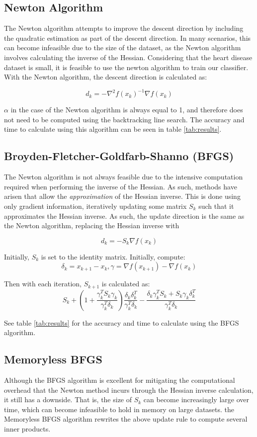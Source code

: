 \documentclass[12pt,conference]{IEEEtran}
\begin{document}
\subsection {Newton Algorithm}
The Newton algorithm attempts to improve the descent direction by including the quadratic estimation as part of the descent direction. In many scenarios, this can become infeasible due to the size of the dataset, as the Newton algorithm involves calculating the inverse of the Hessian. Considering that the heart disease dataset is small, it is feasible to use the newton algorithm to train our classifier. With the Newton algorithm, the descent direction is calculated as:

$$d_k = -\nabla^2f(x_k)^{-1}\nabla f(x_k)$$

$\alpha$ in the case of the Newton algorithm is always equal to 1, and therefore does not need to be computed using the backtracking line search. The accuracy and time to calculate using this algorithm can be seen in table \ref{tab:results}.

\subsection {Broyden-Fletcher-Goldfarb-Shanno (BFGS)}
The Newton algorithm is not always feasible due to the intensive computation required when performing the inverse of the Hessian. As such, methods have arisen that allow the \textit{approximation} of the Hessian inverse. This is done using only gradient information, iteratively updating some matrix $S_k$ such that it approximates the Hessian inverse. As such, the update direction is the same as the Newton algorithm, replacing the Hessian inverse with

$$ d_k = -S_k \nabla f(x_k) $$

Initially, $S_k$ is set to the identity matrix. Initially, compute:
$$ \delta_k = x_{k+1} - x_{k}, \gamma = \nabla f(x_{k+1}) - \nabla f(x_k) $$

Then with each iteration, $S_{k+1}$ is calculated as:
$$ S_k + \left( 1 + \frac{\gamma_k^T S_k \gamma_k}{\gamma_k^T \delta_k} \right) \frac{\delta_k \delta_k^T}{\gamma_k^T\delta_k} - \frac{\delta_k \gamma_k^T S_k + S_k \gamma_k \delta_k^T}{\gamma_k^T\delta_k} $$

See table \ref{tab:results} for the accuracy and time to calculate using the BFGS algorithm.
\subsection {Memoryless BFGS}
Although the BFGS algorithm is excellent for mitigating the computational overhead that the Newton method incurs through the Hessian inverse calculation, it still has a downside. That is, the size of $S_k$ can become increasingly large over time, which can become infeasible to hold in memory on large datasets. the Memoryless BFGS algorithm rewrites the above update rule to compute several inner products.
\end{document}
